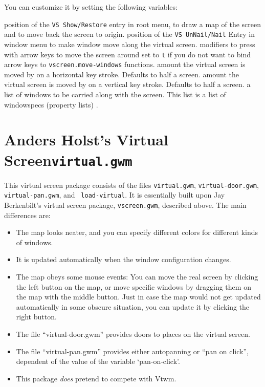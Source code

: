You can customize it by setting the following variables:

\begin{description}
 position of the \verb|VS Show/Restore| entry in root 
menu, to draw a map of the screen and to move back the screen to origin.
 position of the \verb|VS UnNail/Nail| Entry in
window menu to make window move along the virtual screen.
 modifiers to press with arrow keys to move the
screen around
 set to \verb|t| if you do not want to bind arrow
keys to \verb|vscreen.move-windows| functions.
 amount the virtual screen is moved by on a
horizontal key stroke. Defaults to half a screen.
 amount the virtual screen is moved by on a
vertical key stroke. Defaults to half a screen.
 a list of windows to be carried along with the
screen. This list is a list of windowspecs (property lists)
.
\end{description}

\section{Anders Holst's Virtual Screen\hfill{\tt virtual.gwm}}
\label{virtual}

This virtual screen package consists of the files {\tt virtual.gwm},
{\tt virtual-door.gwm}, {\tt virtual-pan.gwm}, and {\tt
load-virtual}. It is essentially built upon Jay Berkenbilt's virtual
screen package, {\tt vscreen.gwm}, described above. The main
differences are: 

\begin{itemize} 
\item The map looks neater, and you can specify different colors for 
    different kinds of windows.
\item It is updated automatically when the window configuration changes.
\item The map obeys some mouse events: You can move the real screen by
    clicking the left button on the map, or move specific windows by
    dragging them on the map with the middle button. Just in case the
    map would not get updated automatically in some obscure situation,
    you can update it by clicking the right button.
\item The file ``virtual-door.gwm'' provides doors to places on the virtual
    screen.
\item The file ``virtual-pan.gwm'' provides either autopanning or ``pan on
    click'', dependent of the value of the variable `pan-on-click'. 
\item This package {\em does\/} pretend to compete with {\sc Vtwm}.
\end{itemize}

